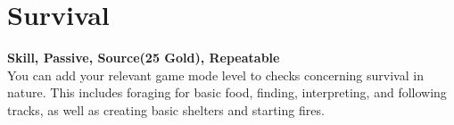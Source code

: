 \section{Survival}\label{sec:survival}
\textbf{Skill, Passive, Source(25 Gold), Repeatable}\\
You can add your relevant game mode level to checks concerning survival in nature.
This includes foraging for basic food, finding, interpreting, and following tracks, as well as creating basic shelters and starting fires.